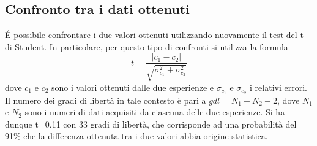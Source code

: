\subsection{Confronto tra i dati ottenuti}
\'E possibile confrontare i due valori ottenuti utilizzando nuovamente il test del t di Student. In particolare, per questo tipo di confronti si utilizza la formula
\begin{equation}
    t=\frac{|c_1-c_2|}{\sqrt{\sigma_{c_1}^2+\sigma_{c_2}^2}}
\end{equation}
dove $c_1$ e $c_2$ sono i valori ottenuti dalle due esperienze e $\sigma_{c_1}$ e $\sigma_{c_2}$ i relativi errori. Il numero dei gradi di libertà in tale contesto è pari a $gdl=N_1+N_2-2$, dove $N_1$ e $N_2$ sono i numeri di dati acquisiti da ciascuna delle due esperienze.
Si ha dunque t=0.11 con 33 gradi di libertà, che corrisponde ad una probabilità del 91\% che la differenza ottenuta tra i due valori abbia origine statistica.
